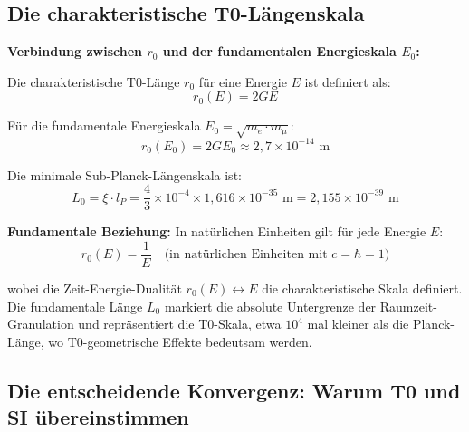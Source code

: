 \documentclass[12pt,a4paper]{article}
\begin{document}
	\subsection{Die charakteristische T0-L{\"a}ngenskala}
	
	\begin{insight}
		\textbf{Verbindung zwischen $r_0$ und der fundamentalen Energieskala $E_0$:}
		
		Die charakteristische T0-Länge $r_0$ für eine Energie $E$ ist definiert als:
		\begin{equation}
			r_0(E) = 2GE
		\end{equation}
		
		Für die fundamentale Energieskala $E_0 = \sqrt{m_e \cdot m_\mu}$:
		\begin{equation}
			r_0(E_0) = 2GE_0 \approx 2{,}7 \times 10^{-14} \text{ m}
		\end{equation}
		
		Die minimale Sub-Planck-Längenskala ist:
		\begin{equation}
			\boxed{L_0 = \xi \cdot l_P = \frac{4}{3} \times 10^{-4} \times 1{,}616 \times 10^{-35} \text{ m} = 2{,}155 \times 10^{-39} \text{ m}}
		\end{equation}
		
		\textbf{Fundamentale Beziehung:} In natürlichen Einheiten gilt für jede Energie $E$:
		\begin{equation}
			r_0(E) = \frac{1}{E} \quad \text{(in natürlichen Einheiten mit } c = \hbar = 1\text{)}
		\end{equation}
		
		wobei die Zeit-Energie-Dualität $r_0(E) \leftrightarrow E$ die charakteristische Skala definiert. Die fundamentale Länge $L_0$ markiert die absolute Untergrenze der Raumzeit-Granulation und repr{\"a}sentiert die T0-Skala, etwa $10^4$ mal kleiner als die Planck-L{\"a}nge, wo T0-geometrische Effekte bedeutsam werden.
	\end{insight}
	
	\subsection{Die entscheidende Konvergenz: Warum T0 und SI {\"u}bereinstimmen}
	
\end{document}
